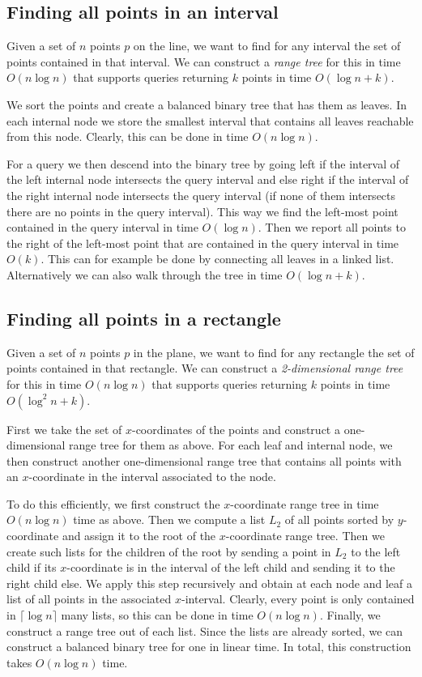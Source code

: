 \documentclass[11pt, a4paper, twocolumn]{article}
\begin{document}
\subsection{Finding all points in an interval}

Given a set of $n$ points $p$ on the line, we want to find for any interval
the set of points contained in that interval. We can construct a \textit{range tree}
for this in time $O(n \log n)$ that supports queries returning $k$ points in time $O(\log n + k)$.

We sort the points and create a balanced binary tree that has them as leaves.
In each internal node we store the smallest interval that contains all leaves
reachable from this node. Clearly, this can be done in time $O(n \log n)$.

For a query we then descend into the binary tree by going left if the interval
of the left internal node intersects the query interval and else right if the 
interval of the right internal node intersects the query interval
(if none of them intersects there are no points in the query interval).
This way we find the left-most point contained in the query interval in time $O(\log n)$.
Then we report all points to the right of the left-most point that are contained in the
query interval in time $O(k)$. This can for example be done by connecting all leaves in 
a linked list. Alternatively we can also walk through the tree in time $O(\log n + k)$.

\subsection{Finding all points in a rectangle}

Given a set of $n$ points $p$ in the plane, we want to find for any rectangle the set
of points contained in that rectangle. We can construct a \textit{2-dimensional range tree}
for this in time $O(n \log n)$ that supports queries returning $k$ points in time $O(\log^2 n + k)$.

First we take the set of $x$-coordinates of the points and construct a one-dimensional range tree
for them as above. For each leaf and internal node, we then construct another one-dimensional range tree
that contains all points with an $x$-coordinate in the interval associated to the node.

To do this efficiently, we first construct the $x$-coordinate range tree in time $O(n \log n)$ time as above.
Then we compute a list $L_2$ of all points sorted by $y$-coordinate and assign it to the root of the
$x$-coordinate range tree. Then we create such lists for the children of the root by sending a point in $L_2$ to the
left child if its $x$-coordinate is in the interval of the left child and sending it to the right child else.
We apply this step recursively and obtain at each node and leaf a list of all points in the associated $x$-interval. Clearly, every point
is only contained in $\lceil\log n\rceil$ many lists, so this can be done in time $O(n \log n)$.
Finally, we construct a range tree out of each list. Since the lists are already sorted, we can
construct a balanced binary tree for one in linear time. In total, this construction takes $O(n \log n)$ time.
\end{document}
